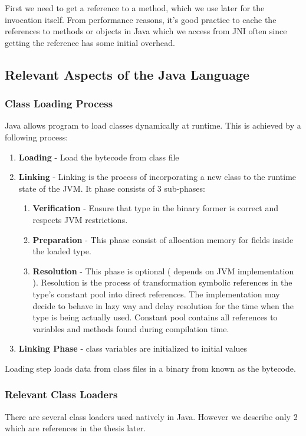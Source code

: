 First we need to get a reference to a method, which we use later for the invocation itself. From performance reasons, it's good practice to cache the references to methods or objects in Java which we access from JNI often since getting the reference has some initial overhead.

\subsection{Relevant Aspects of the  Java Language}

\subsubsection{Class Loading Process}
Java allows program to load classes dynamically at runtime. This is achieved by a following process:
\begin{enumerate}
	\item \textbf{Loading} - Load the bytecode from class file
	\item \textbf{Linking} - Linking is the process of incorporating a new class to the runtime state of the JVM. It phase consists of 3 sub-phases:
	\begin{enumerate}
		\item \textbf{Verification} - Ensure that type in the binary former is correct and respects JVM restrictions.
		\item \textbf{Preparation} - This phase consist of allocation memory for fields inside the loaded type.
		\item \textbf{Resolution} - This phase is optional ( depends on JVM implementation ). Resolution is the process of transformation symbolic references in the type's constant pool into direct references. The implementation may decide to behave in lazy way and delay resolution for the time when the type is being actually used. Constant pool contains all references to variables and methods found during compilation time.
	\end{enumerate}
	\item \textbf{Linking Phase} - class variables are initialized to initial values
\end{enumerate}

Loading step loads data from class files in a binary from known as the bytecode.
\subsubsection{Relevant Class Loaders}
There are several class loaders used natively in Java. However we describe only 2 which are references in the thesis later. 

